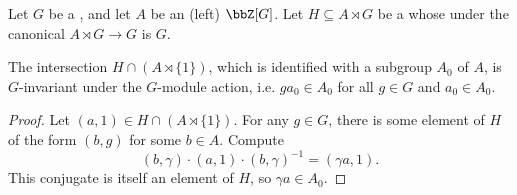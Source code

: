 \begin{lemma} \label{lemma:intersection_of_a_subgroup_of_a_semidirect_product_of_a_group_module_with_base_abelian_group_that_surjects_to_quotient_group_is_invariant_subgroup}
    Let $G$ be a , and let $A$ be an (left) $\bbZ[G]$. Let $H \subseteq A \rtimes G$ be a  whose  under the canonical   $A \rtimes G \to G$ is $G$. 

    The intersection $H \cap (A \rtimes \{1\})$, which is identified with a subgroup $A_0$ of $A$, is $G$-invariant under the $G$-module action, i.e. $g a_0  \in A_0$ for all $g \in G$ and $a_0 \in A_0$. 
\end{lemma}
\begin{proof}
    Let $(a,1) \in H \cap (A \rtimes \{1\})$. For any $g \in G$, there is some element of $H$ of the form $(b,g)$ for some $b \in A$. Compute
    $$(b,\gamma) \cdot (a,1) \cdot (b, \gamma)^{-1} = (\gamma a , 1).$$
    This conjugate is itself an element of $H$, so $\gamma a \in A_0$. 
\end{proof}